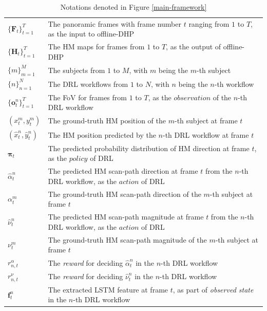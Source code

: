 \documentclass[10pt,journal,compsoc]{IEEEtran}
\begin{document}
\begin{table}
\center
\caption{Notations denoted in Figure \ref{main-framework}} \label{notation_framework}
\begin{tabular}{ll}
$\{\mathbf{F}_t\}_{t=1}^{T}$ & The panoramic frames with frame number $t$ ranging from $1$ to $T$, as the input to offline-DHP\\
$\{\mathbf{H}_t\}_{t=1}^{T}$ & The HM maps for frames from $1$ to $T$, as the output of offline-DHP\\
$\{m\}_{m=1}^{M}$ & The subjects from $1$ to $M$, with $m$ being the $m$-th subject\\
$\{n\}_{n=1}^{N}$ & The DRL workflows from $1$ to $N$, with $n$ being the $n$-th workflow\\
$\{\mathbf{o}^n_t\}_{t=1}^{T}$ & The FoV for frames from $1$ to $T$, as the $observation$ of the $n$-th DRL workflow \\
$(x^m_t, y^m_t)$ & The ground-truth HM position of the $m$-th subject at frame $t$ \\
$(\hat{x}^n_t, \hat{y}^n_t)$ & The HM position predicted by the $n$-th DRL workflow at frame $t$  \\
$\mathbf{\pi}_t$ & The predicted probability distribution of HM direction at frame $t$, as the $policy$ of DRL \\
$\hat{\alpha}^n_t$ & The predicted HM scan-path direction at frame $t$ from the $n$-th DRL workflow, as the $action$ of DRL\\
$\alpha^m_t$ & The ground-truth HM scan-path direction of the $m$-th subject at frame $t$ \\
$\hat{\nu}^n_t$ & The predicted HM scan-path magnitude at frame $t$ from the $n$-th DRL workflow, as the $action$ of DRL\\
$\nu^m_t$ & The ground-truth HM scan-path magnitude of the $m$-th subject at frame $t$ \\
$r^{\alpha}_{n,t}$ & The \textit{reward} for deciding $\hat{\alpha}^n_t$ in the $n$-th DRL workflow\\
$r^{\nu}_{n,t}$ & The \textit{reward} for deciding $\hat{\nu}^n_t$ in  the $n$-th DRL workflow\\
$\mathbf{f}^n_{t}$ & The extracted LSTM feature at frame $t$,  as part of \textit{observed state} in the $n$-th DRL workflow \\
\end{tabular}
\end{table}
\end{document}
